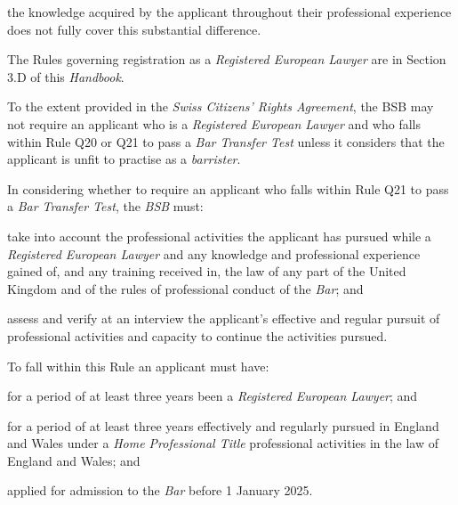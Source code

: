 \item the knowledge acquired by the applicant throughout their professional
experience does not fully cover this substantial difference.\ln




The Rules governing registration as a \emph{Registered European Lawyer}
are in Section 3.D of this \emph{Handbook}.


To the extent provided in the \emph{Swiss Citizens' Rights Agreement},
the BSB may not require an applicant who is a \emph{Registered European
Lawyer} and who falls within Rule Q20 or Q21 to pass a \emph{Bar
Transfer Test} unless it considers that the applicant is unfit to
practise as a \emph{barrister}.


In considering whether to require an applicant who falls within Rule Q21
to pass a \emph{Bar Transfer Test}, the \emph{BSB} must:

\nl \item take into account the professional activities the applicant has
pursued while a \emph{Registered European Lawyer} and any knowledge and
professional experience gained of, and any training received in, the law
of any part of the United Kingdom and of the rules of professional
conduct of the \emph{Bar}; and

\item assess and verify at an interview the applicant's effective and
regular pursuit of professional activities and capacity to continue the
activities pursued.\ln


To fall within this Rule an applicant must have:

\nl \item for a period of at least three years been a \emph{Registered European
Lawyer}; and

 \item for a period of at least three years effectively and regularly
pursued in England and Wales under a \emph{Home Professional Title}
professional activities in the law of England and Wales; and

\item applied for admission to the \emph{Bar} before 1 January 2025.\ln


